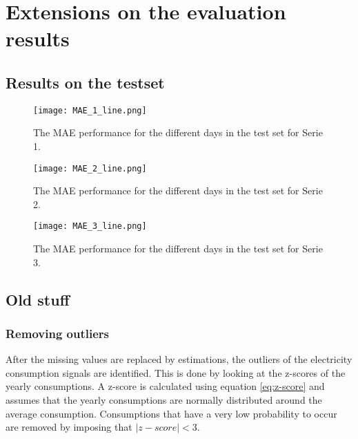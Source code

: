 \chapter{Extensions on the evaluation results}
\label{app:Extensions on the evaluation results}

\section{Results on the testset}

\begin{figure}[h]
	\centering
	\texttt{[image: MAE\_1\_line.png]}
	\caption{The MAE performance for the different days in the test set for Serie 1.}
	\label{fig:MAE_line_serie1}
\end{figure}

\begin{figure}[h]
	\centering
	\texttt{[image: MAE\_2\_line.png]}
	\caption{The MAE performance for the different days in the test set for Serie 2.}
	\label{fig:MAE_line_serie2}
\end{figure}	

\begin{figure}[h]
	\centering
	\texttt{[image: MAE\_3\_line.png]}
	\caption{The MAE performance for the different days in the test set for Serie 3.}
	\label{fig:MAE_line_serie3}
\end{figure}









\section{Old stuff}
\subsection{Removing outliers}


After the missing values are replaced by estimations, the outliers of the electricity consumption signals are identified.
This is done by looking  at the z-scores of the yearly consumptions. A z-score is calculated using equation \ref{eq:z-score} and assumes that the yearly consumptions are normally distributed around the average consumption. Consumptions that have a very low probability to occur are removed by imposing that $ |z-score| < 3 $.

